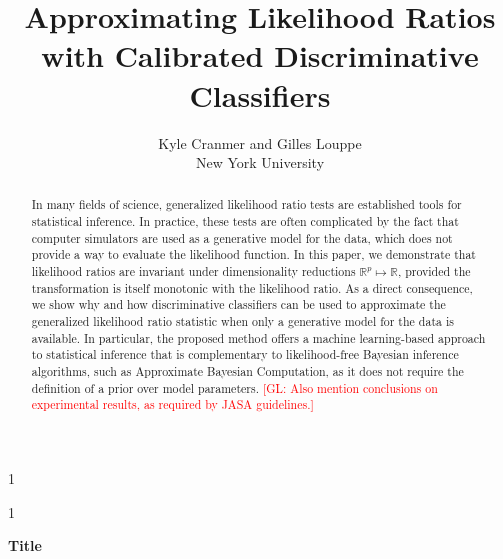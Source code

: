 \documentclass[12pt]{article}
\newcommand{\blind}{1}
\numberwithin{equation}{section}
\theoremstyle{plain}
\newcommand{\glnote}[1]{\textcolor{red}{[GL: #1]}}
\begin{document}
\def\spacingset#1{\renewcommand{\baselinestretch}%
{#1}\small\normalsize} \spacingset{1}



\blind
{
  \title{\bf Approximating Likelihood Ratios with Calibrated Discriminative Classifiers}
  \author{Kyle Cranmer and Gilles Louppe\\
          New York University}
  \maketitle
} \fi

\blind
{
  \bigskip
  \bigskip
  \bigskip
  \begin{center}
    {\LARGE\bf Title}
\end{center}
  \medskip
} \fi

\bigskip
\begin{abstract}


In many fields of science, generalized likelihood ratio tests are established tools for
statistical inference. In practice, these tests are often complicated by the fact
that computer simulators are used as a generative model for the data, which does
not provide a way to evaluate the likelihood function. In this paper, we
demonstrate that likelihood ratios are invariant under dimensionality reductions $\mathbb{R}^p \mapsto \mathbb{R}$,
provided the transformation is itself monotonic with the likelihood ratio. As a direct
consequence, we show why and how discriminative classifiers can be used to
approximate the generalized likelihood ratio statistic when only a generative model for the data is
available. In particular, the proposed method offers a machine learning-based
approach to statistical inference that is complementary to likelihood-free
Bayesian inference algorithms, such as Approximate Bayesian Computation, as it does
not require the definition of a prior over model parameters. \glnote{Also
mention conclusions on experimental results, as required by JASA guidelines.}

\end{abstract}
\end{document}

